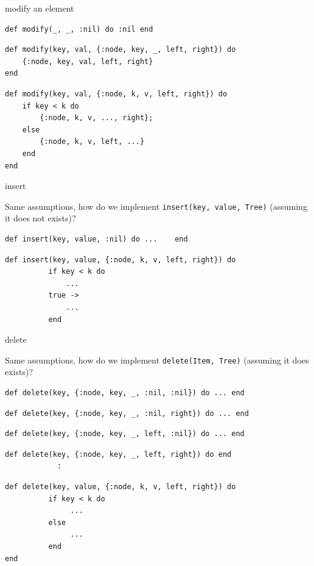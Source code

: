 \begin{frame}[fragile]{modify an element}

\begin{verbatim}
def modify(_, _, :nil) do :nil end
\end{verbatim}
\pause
\begin{verbatim}
def modify(key, val, {:node, key, _, left, right}) do 
    {:node, key, val, left, right}
end
\end{verbatim}
\pause
\begin{verbatim}
def modify(key, val, {:node, k, v, left, right}) do 
    if key < k do
        {:node, k, v, ..., right};
    else
        {:node, k, v, left, ...}
    end
end
\end{verbatim}

\end{frame}


\begin{frame}[fragile]{insert}

Same assumptions, how do we implement {\tt insert(key, value, Tree)} (assuming it does not exists)?

\pause\vspace{20pt}

\begin{verbatim}
def insert(key, value, :nil) do ...    end
\end{verbatim}
\pause
\begin{verbatim}
def insert(key, value, {:node, k, v, left, right}) do 
          if key < k do
              ... 
          true -> 
              ...
          end
\end{verbatim}

\end{frame}


\begin{frame}[fragile]{delete}

Same assumptions, how do we implement {\tt delete(Item, Tree)} (assuming it does exists)?

\pause\vspace{20pt}

\begin{verbatim}
def delete(key, {:node, key, _, :nil, :nil}) do ... end
\end{verbatim}
\pause
\begin{verbatim}
def delete(key, {:node, key, _, :nil, right}) do ... end
\end{verbatim}
\pause
\begin{verbatim}
def delete(key, {:node, key, _, left, :nil}) do ... end
\end{verbatim}
\pause
\begin{verbatim}
def delete(key, {:node, key, _, left, right}) do end
            :
\end{verbatim}
\pause
\begin{verbatim}
def delete(key, value, {:node, k, v, left, right}) do 
          if key < k do
               ...
          else
               ...
          end
end
\end{verbatim}
\end{frame}

